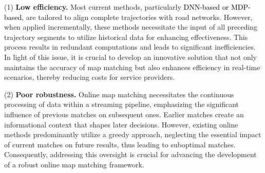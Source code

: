 \noindent (1) \textbf{Low efficiency.} Most current methods, particularly \textcolor{black}{DNN-based or MDP-based}, are tailored to align complete trajectories with road networks. However, when applied incrementally, these methods necessitate the input of all preceding trajectory segments to utilize historical data for enhancing effectiveness. This process results in redundant computations and leads to significant inefficiencies. In light of this issue, it is crucial to develop an innovative solution that not only maintains the accuracy of map matching but also enhances efficiency in real-time scenarios, thereby reducing costs for service providers.

\noindent (2) \textbf{Poor robustness.} Online map matching necessitates the continuous processing of data within a streaming pipeline, emphasizing the significant influence of previous matches on subsequent ones. Earlier matches create an informational context that shapes later decisions. However, existing online methods predominantly utilize a greedy approach, neglecting the essential impact of current matches on future results, thus leading to suboptimal matches. Consequently, addressing this oversight is crucial for advancing the development of a robust online map matching framework.



